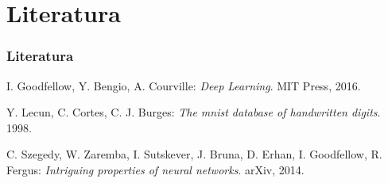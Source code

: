\documentclass[czech]{beamer}
\begin{document}
\section*{Literatura}

\begin{frame}
    \frametitle{Literatura}
    \begin{thebibliography}{1}
        I. Goodfellow, Y. Bengio, A. Courville:
        \emph{Deep Learning}. MIT Press, 2016.

         Y. Lecun, C. Cortes, C. J. Burges:
        \emph{The mnist database of handwritten digits}. 1998.

         C. Szegedy, W. Zaremba, I. Sutskever, J. Bruna, D. Erhan, I. Goodfellow, R. Fergus:
        \emph{Intriguing properties of neural networks}.
        arXiv, 2014.

    \end{thebibliography}
\end{frame}



\end{document}
